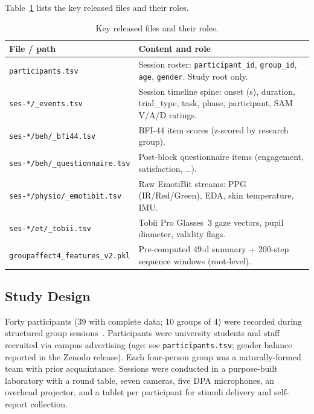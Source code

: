 \documentclass[sigconf,nonacm]{acmart}
\begin{document}
Table~\ref{tab:dataset_files} lists the key released files and their roles.

\begin{table}[t]
\caption{Key released files and their roles.}
\label{tab:dataset_files}
\centering
\setlength{\tabcolsep}{2pt}
\small
\begin{tabular}{lp{}}
\toprule
\textbf{File / path} & \textbf{Content and role} \\
\midrule
\texttt{participants.tsv} &
  Session roster: \texttt{participant\_id}, \texttt{group\_id},
  \texttt{age}, \texttt{gender}. Study root only. \\
\texttt{ses-*/\allowbreak*\_events.tsv} &
  Session timeline spine: onset (s), duration, trial\_type, task,
  phase, participant, SAM V/A/D ratings. \\
\texttt{ses-*/beh/\allowbreak*\_bfi44.tsv} &
  BFI-44 item scores (z-scored by research group). \\
\texttt{ses-*/beh/\allowbreak*\_questionnaire.tsv} &
  Post-block questionnaire items (engagement, satisfaction, \ldots). \\
\texttt{ses-*/physio/\allowbreak*\_emotibit.tsv} &
  Raw EmotiBit streams: PPG (IR/Red/Green), EDA, skin temperature, IMU. \\
\texttt{ses-*/et/\allowbreak*\_tobii.tsv} &
  Tobii Pro Glasses~3 gaze vectors, pupil diameter, validity flags. \\
\texttt{groupaffect4\_features\_v2.pkl} &
  Pre-computed 49-d summary + 200-step sequence windows (root-level). \\
\bottomrule
\end{tabular}
\end{table}

\subsection{Study Design}
Forty participants (39 with complete data; 10 groups of 4) were recorded
during structured group sessions~\cite{groupaffect4}.
Participants were university students and staff recruited via campus advertising
(age: see \texttt{participants.tsv}; gender balance reported in the Zenodo release).
Each four-person group was a naturally-formed team with prior acquaintance.
Sessions were conducted in a purpose-built laboratory with a round table,
seven cameras, five DPA microphones, an overhead projector, and a tablet
per participant for stimuli delivery and self-report collection.
\end{document}
